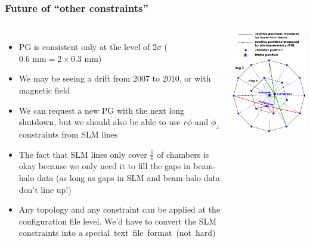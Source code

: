\documentclass[compress]{beamer}
\begin{document}
\begin{frame}
\frametitle{Future of ``other constraints''}
\begin{columns}
\begin{itemize}
\item PG is consistent only at the level of 2$\sigma$ ($0.6\mbox{ mm} = 2\times 0.3\mbox{ mm}$)

\item We may be seeing a drift from 2007 to 2010, or with magnetic field

\item We can request a new PG with the next long shutdown, but we should also be able to use $r\phi$ and $\phi_z$ constraints from SLM lines

\item The fact that SLM lines only cover $\frac{1}{6}$ of chambers is okay because we only need it to fill the gaps in beam-halo data (as long as gaps in SLM and beam-halo data don't line up!)

\item Any topology and any constraint can be applied at the configuration file level.  We'd have to convert the SLM constraints into a \mbox{special text file format (not hard)\hspace{-5 cm}}
\end{itemize}

\includegraphics[width=\linewidth]{beamhalo-PG-SLM.pdf}
\end{columns}
\end{frame}
\end{document}
